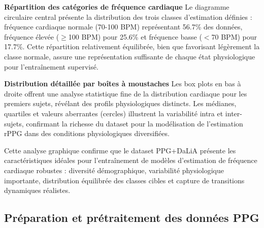 \textbf{Répartition des catégories de fréquence cardiaque}
Le diagramme circulaire central présente la distribution des trois classes d'estimation définies : fréquence cardiaque normale (70-100 BPM) représentant 56.7\% des données, fréquence élevée ($\geq$100 BPM) pour 25.6\% et fréquence basse ($<$70 BPM) pour 17.7\%. Cette répartition relativement équilibrée, bien que favorisant légèrement la classe normale, assure une représentation suffisante de chaque état physiologique pour l'entraînement supervisé.

\textbf{Distribution détaillée par boîtes à moustaches}
Les box plots en bas à droite offrent une analyse statistique fine de la distribution cardiaque pour les premiers sujets, révélant des profils physiologiques distincts. Les médianes, quartiles et valeurs aberrantes (cercles) illustrent la variabilité intra et inter-sujets, confirmant la richesse du dataset pour la modélisation de l'estimation rPPG dans des conditions physiologiques diversifiées.

Cette analyse graphique confirme que le dataset PPG+DaLiA présente les caractéristiques idéales pour l'entraînement de modèles d'estimation de fréquence cardiaque robustes : diversité démographique, variabilité physiologique importante, distribution équilibrée des classes cibles et capture de transitions dynamiques réalistes.

\subsection{Préparation et prétraitement des données PPG}


